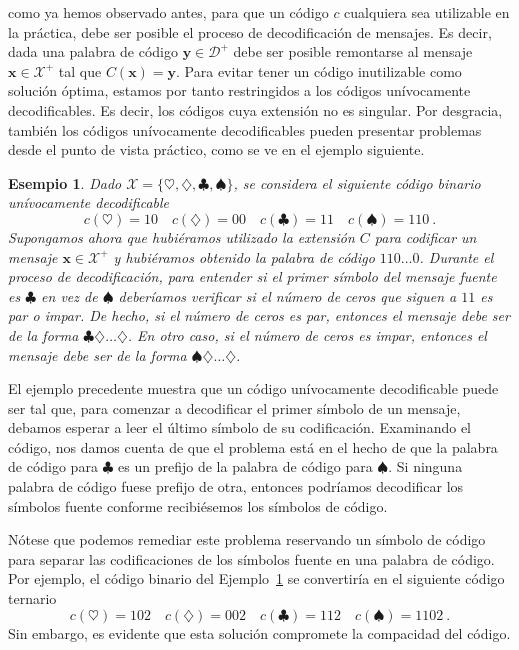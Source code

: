 \documentclass[11pt]{article}
\newtheorem{example}[theorem]{Esempio}
\newcommand{\bx}{ \boldsymbol{x} }
\newcommand{\by}{ \boldsymbol{y} }
\newcommand{\scD}{\mathcal{D}}
\newcommand{\scX}{\mathcal{X}}
\begin{document}
como ya hemos observado antes, para que un código $c$ cualquiera sea utilizable en la práctica, debe ser posible el proceso de decodificación de mensajes. Es decir, dada una palabra de código $\by\in\scD^+$ debe ser posible remontarse al mensaje $\bx\in\scX^+$ tal que $C(\bx)=\by$. Para evitar tener un código inutilizable como solución óptima, estamos por tanto restringidos a los códigos unívocamente decodificables. Es decir, los códigos cuya extensión no es singular. Por desgracia, también los códigos unívocamente decodificables pueden presentar problemas desde el punto de vista práctico, como se ve en el ejemplo siguiente.
%
\begin{example}
\label{ex:ud}
Dado $\scX = \{\heartsuit,\diamondsuit,\clubsuit,\spadesuit\}$, se considera el siguiente código binario unívocamente decodificable
\[
    c(\heartsuit) = 10 \quad c(\diamondsuit) = 00 \quad c(\clubsuit) = 11 \quad c(\spadesuit) = 110~.
\]
Supongamos ahora que hubiéramos utilizado la extensión $C$ para codificar un mensaje $\bx\in\scX^+$ y hubiéramos obtenido la palabra de código $110\dots 0$. Durante el proceso de decodificación, para entender si el primer símbolo del mensaje fuente es $\clubsuit$ en vez de $\spadesuit$ deberíamos verificar si el número de ceros que siguen a $11$ es par o impar. De hecho, si el número de ceros es par, entonces el mensaje debe ser de la forma $\clubsuit\diamondsuit\dots\diamondsuit$. En otro caso, si el número de ceros es impar, entonces el mensaje debe ser de la forma $\spadesuit\diamondsuit\dots\diamondsuit$.
\end{example}
%
El ejemplo precedente muestra que un código unívocamente decodificable puede ser tal que, para comenzar a decodificar el primer símbolo de un mensaje, debamos esperar a leer el último símbolo de su codificación. Examinando el código, nos damos cuenta de que el problema está en el hecho de que la palabra de código para $\clubsuit$ es un prefijo de la palabra de código para $\spadesuit$. Si ninguna palabra de código fuese prefijo de otra, entonces podríamos decodificar los símbolos fuente conforme recibiésemos los símbolos de código.

Nótese que podemos remediar este problema reservando un símbolo de código para separar las codificaciones de los símbolos fuente en una palabra de código. Por ejemplo, el código binario del Ejemplo~\ref{ex:ud} se convertiría en el siguiente código ternario
\[
    c(\heartsuit) = 102 \quad c(\diamondsuit) = 002 \quad c(\clubsuit) = 112 \quad c(\spadesuit) = 1102~.
\]
Sin embargo, es evidente que esta solución compromete la compacidad del código.
\end{document}
